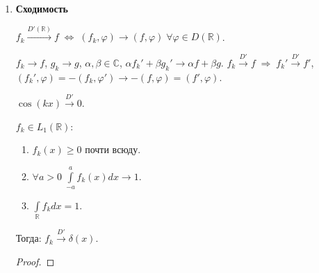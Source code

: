 \begin{enumerate}
\begin{exercise}
  \end{exercise}
\item
  \textbf{Сходимость}

  \begin{definition}

  \(f_{k}  \xrightarrow{D'  (\mathbb{R} )} f  \;  \Leftrightarrow   \;  (f_{k}, \varphi )  \rightarrow   (f, \varphi )  \;  \forall  \varphi   \in  D  (\mathbb{R} )\).

  \end{definition}

  \(f_{k}  \rightarrow  f\), \(g_{k}  \rightarrow  g\),
  \(\alpha , \beta   \in  \mathbb{C} \),
  \(\alpha  f_{k}'  + \beta  g_{k}'  \rightarrow  \alpha  f  + \beta  g\).
  \(f_{k}  \xrightarrow{D'} f  \;  \Rightarrow   \; f_{k}'  \xrightarrow{D'} f'\),
  \((f_{k}', \varphi )  =  -   (f_{k}, \varphi ')  \rightarrow   -   (f, \varphi )  =  (f', \varphi )\).

  \begin{exercise}

  \(\cos  (k x)  \xrightarrow{D'}  0\).

  \end{exercise}

  \begin{theorem}

  \(f_{k}  \in  L_{1}  (\mathbb{R} )\):

  \begin{enumerate}
  \def\labelenumii{\arabic{enumii}.}
  \item
    \(f_{k}  (x)  \geqslant  0\) почти всюду.
  \item
    \(\forall  a  >  0  \;  \int \limits_{-  a}^{a} f_{k}  (x) d x  \rightarrow   1\).
  \item
    \(\int \limits_{\mathbb{R} } f_{k} d x  =  1\).
  \end{enumerate}

  Тогда: \(f_{k}  \xrightarrow{D'} \delta   (x)\).

  \end{theorem}

  \begin{proof}


\end{proof}
\end{enumerate}
